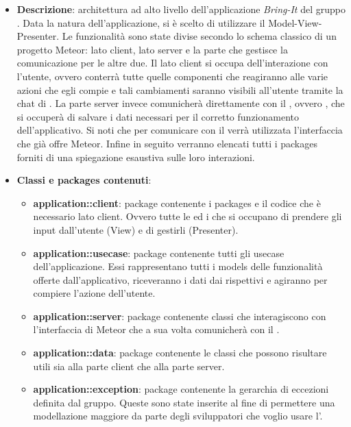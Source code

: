\begin{itemize}

	\item \textbf{Descrizione}: architettura ad alto livello dell’applicazione \textit{Bring-It} del gruppo \gruppo. Data la natura dell'applicazione, si è scelto di utilizzare il  Model-View-Presenter. Le funzionalità sono state divise secondo lo schema classico di un progetto Meteor: lato client, lato server e la parte che gestisce la comunicazione per le altre due. Il lato client si occupa dell'interazione con l'utente, ovvero conterrà tutte quelle componenti che reagiranno alle varie azioni che egli compie e tali cambiamenti saranno visibili all'utente tramite la chat di . La parte server invece comunicherà direttamente con il , ovvero , che si occuperà di salvare i dati necessari per il corretto funzionamento dell'applicativo. Si noti che per comunicare con il  verrà utilizzata l'interfaccia che già offre Meteor.
Infine in seguito verranno elencati tutti i packages forniti di una spiegazione esaustiva sulle loro interazioni.
	\item \textbf{Classi e packages contenuti}:
	\begin{itemize}
		\item \textbf{application::client}: package contenente i packages e il codice che è necessario lato client. Ovvero tutte le  ed i  che si occupano di prendere gli input dall'utente (View) e di gestirli (Presenter).
		\item \textbf{application::usecase}: package contenente tutti gli usecase dell'applicazione. Essi rappresentano tutti i models delle funzionalità offerte dall'applicativo, riceveranno i dati dai rispettivi  e agiranno per compiere l'azione dell'utente.
		\item \textbf{application::server}: package contenente classi che interagiscono con l'interfaccia di Meteor che a sua volta comunicherà con il  .
		\item \textbf{application::data}: package contenente le classi che possono risultare utili sia alla parte client che alla parte server.
		\item \textbf{application::exception}: package contenente la gerarchia di eccezioni definita dal gruppo. Queste sono state inserite al fine di permettere una modellazione maggiore da parte degli sviluppatori che voglio usare l'.

\end{itemize}
\end{itemize}
